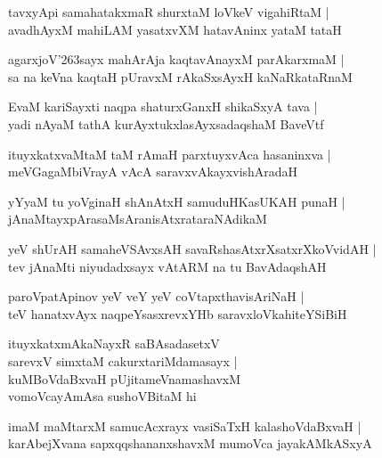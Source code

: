 \documentclass[twoside,12pt,openright]{book}
\def\S{\char'263}
\newcounter{shloka}[chapter]
\begin{document}
\begin{shloka}%
tavxyApi samahatakxmaR shurxtaM loVkeV vigahiRtaM |\\
avadhAyxM mahiLAM yasatxvXM hatavAninx yataM tataH 
\end{shloka}

\begin{shloka}%
agarxjoV\S sayx mahArAja kaqtavAnayxM parAkarxmaM |\\
sa na keVna kaqtaH pUravxM rAkaSxsAyxH kaNaRkataRnaM 
\end{shloka}

\begin{shloka}%
EvaM kariSayxti naqpa shaturxGanxH shikaSxyA tava |\\
yadi nAyaM tathA kurAyxtukxlasAyxsadaqshaM BaveVtf 
\end{shloka}

\begin{shloka}%
ituyxkatxvaMtaM taM rAmaH parxtuyxvAca hasaninxva |\\
meVGagaMbiVrayA vAcA saravxvAkayxvishAradaH 
\end{shloka}

\begin{shloka}%
yYyaM tu yoVginaH shAnAtxH samuduHKasUKAH punaH |\\
jAnaMtayxpArasaMsAranisAtxrataraNAdikaM 
\end{shloka}

\begin{shloka}%
yeV shUrAH samaheVSAvxsAH savaRshasAtxrXsatxrXkoVvidAH |\\
tev jAnaMti niyudadxsayx vAtARM na tu BavAdaqshAH 
\end{shloka}

\begin{shloka}%
paroVpatApinov yeV veY yeV coVtapxthavisAriNaH |\\
teV hanatxvAyx naqpeYsasxrevxYHb saravxloVkahiteYSiBiH 
\end{shloka}

\begin{shloka}%
ituyxkatxmAkaNayxR saBAsadasetxV \\
sarevxV simxtaM cakurxtariMdamasayx |\\
kuMBoVdaBxvaH pUjitameVnamashavxM \\
vomoVcayAmAsa sushoVBitaM  hi
\end{shloka}

\begin{shloka}%
imaM maMtarxM samucAcxrayx vasiSaTxH kalashoVdaBxvaH |\\
karAbejXvana sapxqqshananxshavxM mumoVca jayakAMkASxyA 
\end{shloka}
\end{document}

